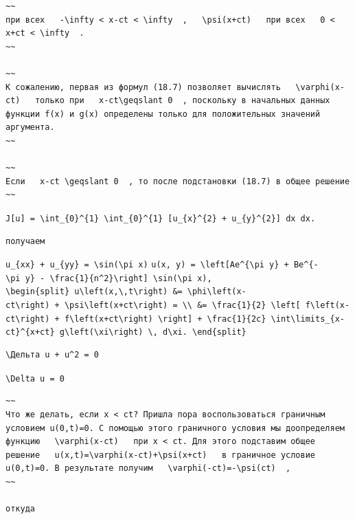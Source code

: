 \documentclass[
  ukrainian,
]{article}
\begin{document}
\begin{verbatim}
~~
при всех   -\infty < x-ct < \infty  ,   \psi(x+ct)   при всех   0 < x+ct < \infty  .
~~

~~
К сожалению, первая из формул (18.7) позволяет вычислять   \varphi(x-ct)   только при   x-ct\geqslant 0  , поскольку в начальных данных функции f(x) и g(x) определены только для положительных значений аргумента.
~~

~~
Если   x-ct \geqslant 0  , то после подстановки (18.7) в общее решение
~~
\end{verbatim}

\texttt{J{[}u{]}\ =\ \textbackslash{}int\_\{0\}\^{}\{1\}\ \textbackslash{}int\_\{0\}\^{}\{1\}\ {[}u\_\{x\}\^{}\{2\}\ +\ u\_\{y\}\^{}\{2\}{]}\ dx\ dx.}

\begin{verbatim}
получаем
\end{verbatim}

\texttt{u\_\{xx\}\ +\ u\_\{yy\}\ =\ \textbackslash{}sin(\textbackslash{}pi\ x)}
\texttt{u(x,\ y)\ =\ \textbackslash{}left{[}Ae\^{}\{\textbackslash{}pi\ y\}\ +\ Be\^{}\{-\textbackslash{}pi\ y\}\ -\ \textbackslash{}frac\{1\}\{n\^{}2\}\textbackslash{}right{]}\ \textbackslash{}sin(\textbackslash{}pi\ x),}
\texttt{\textbackslash{}begin\{split\}\ u\textbackslash{}left(x,\textbackslash{},t\textbackslash{}right)\ \&=\ \textbackslash{}phi\textbackslash{}left(x-ct\textbackslash{}right)\ +\ \textbackslash{}psi\textbackslash{}left(x+ct\textbackslash{}right)\ =\ \textbackslash{}\textbackslash{}\ \&=\ \textbackslash{}frac\{1\}\{2\}\ \textbackslash{}left{[}\ f\textbackslash{}left(x-ct\textbackslash{}right)\ +\ f\textbackslash{}left(x+ct\textbackslash{}right)\ \textbackslash{}right{]}\ +\ \textbackslash{}frac\{1\}\{2c\}\ \textbackslash{}int\textbackslash{}limits\_\{x-ct\}\^{}\{x+ct\}\ g\textbackslash{}left(\textbackslash{}xi\textbackslash{}right)\ \textbackslash{},\ d\textbackslash{}xi.\ \textbackslash{}end\{split\}}

\begin{verbatim}
\Дельта u + u^2 = 0
\end{verbatim}

\texttt{\textbackslash{}Delta\ u\ =\ 0}

\begin{verbatim}
~~
Что же делать, если x < ct? Пришла пора воспользоваться граничным условием u(0,t)=0. С помощью этого граничного условия мы доопределяем функцию   \varphi(x-ct)   при x < ct. Для этого подставим общее решение   u(x,t)=\varphi(x-ct)+\psi(x+ct)   в граничное условие u(0,t)=0. В результате получим   \varphi(-ct)=-\psi(ct)  ,
~~

откуда
\end{verbatim}
\end{document}
